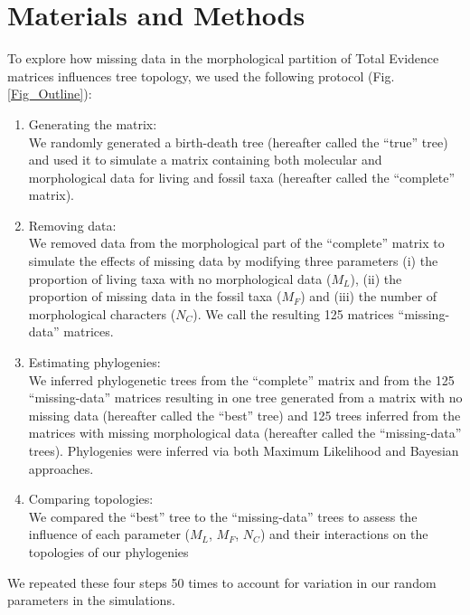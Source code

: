 \section{Materials and Methods}
To explore how missing data in the morphological partition of Total Evidence matrices influences tree topology, we used the following protocol (Fig. \ref{Fig_Outline}):
\begin{enumerate}
\item{Generating the matrix:} \label{step:generate_matrix} \\
We randomly generated a birth-death tree (hereafter called the ``true'' tree) and used it to simulate a matrix containing both molecular and morphological data for living and fossil taxa (hereafter called the ``complete'' matrix).
\item{Removing data:} \label{step:remove_data} \\
We removed data from the morphological part of the ``complete'' matrix to simulate the effects of missing data by modifying three parameters (i) the proportion of living taxa with no morphological data ($M_{L}$), (ii) the proportion of missing data in the fossil taxa ($M_{F}$) and (iii) the number of morphological characters ($N_{C}$). We call the resulting 125 matrices ``missing-data'' matrices.
\item{Estimating phylogenies:} \label{step:build_phylo} \\
We inferred phylogenetic trees from the ``complete'' matrix and from the 125 ``missing-data'' matrices resulting in one tree generated from a matrix with no missing data (hereafter called the ``best'' tree) and 125 trees inferred from the matrices with missing morphological data (hereafter called the ``missing-data'' trees). Phylogenies were inferred via both Maximum Likelihood and Bayesian approaches.
\item{Comparing topologies:} \label{step:compare_topo} \\
We compared the ``best'' tree to the ``missing-data'' trees to assess the influence of each parameter ($M_{L}$, $M_{F}$, $N_{C}$) and their interactions on the topologies of our phylogenies
\end{enumerate}
We repeated these four steps 50 times to account for variation in our random parameters in the simulations.

